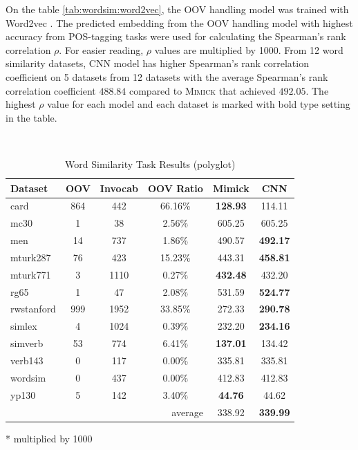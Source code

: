    On the table \ref{tab:wordsim:word2vec}, the OOV handling model
    was trained with Word2vec \citep{Distributed2013mikolov}. The
    predicted embedding from the OOV handling model with highest
    accuracy from POS-tagging tasks were used for calculating the
    Spearman's rank correlation $\rho$. For easier reading, $\rho$
    values are multiplied by 1000. From 12 word similarity datasets,
    CNN model has higher Spearman's rank correlation coefficient on 5
    datasets from 12 datasets with the average Spearman's rank
    correlation coefficient $488.84$ compared to \textsc{Mimick}
    that achieved $492.05$. The highest $\rho$ value for each model
    and each dataset is marked with bold type setting in the table.

    \begin{table}[!ht]
      \begin{threeparttable} 
      \begin{center}
        \caption{Word Similarity Task Results (polyglot)}
        ~\\
        \label{tab:wordsim:polyglot}
        \begin{tabular}{l|c|c|c|c|c}
          \textbf{Dataset} & \textbf{OOV} & \textbf{Invocab} & \textbf{OOV Ratio} & \textbf{Mimick}\tnote{*} & \textbf{CNN}\tnote{*}\\
          \hline
          card & 864 & 442 & 66.16\% & \textbf{128.93} & 114.11\\
          mc30 & 1 & 38 & 2.56\% & 605.25 & 605.25\\
          men & 14 & 737 & 1.86\% & 490.57 & \textbf{492.17}\\
          mturk287 & 76 & 423 & 15.23\% & 443.31 & \textbf{458.81}\\
          mturk771 & 3 & 1110 & 0.27\% & \textbf{432.48} & 432.20\\
          rg65 & 1 & 47 & 2.08\% & 531.59 & \textbf{524.77}\\
          rwstanford & 999 & 1952 & 33.85\% & 272.33 & \textbf{290.78}\\
          simlex & 4 & 1024 & 0.39\% & 232.20 & \textbf{234.16}\\
          simverb & 53 & 774 & 6.41\% & \textbf{137.01} & 134.42\\
          verb143 & 0 & 117 & 0.00\% & 335.81 & 335.81\\
          wordsim & 0 & 437 & 0.00\% & 412.83 & 412.83\\
          yp130 & 5 & 142 & 3.40\% & \textbf{44.76} & 44.62\\
          \hline
          \multicolumn{4}{r|}{average} & 338.92 & \textbf{339.99}\\
        \end{tabular}
        \begin{tablenotes}
          \item[*] multiplied by 1000
        \end{tablenotes}
      \end{center}
    \end{threeparttable} 
    \end{table}

